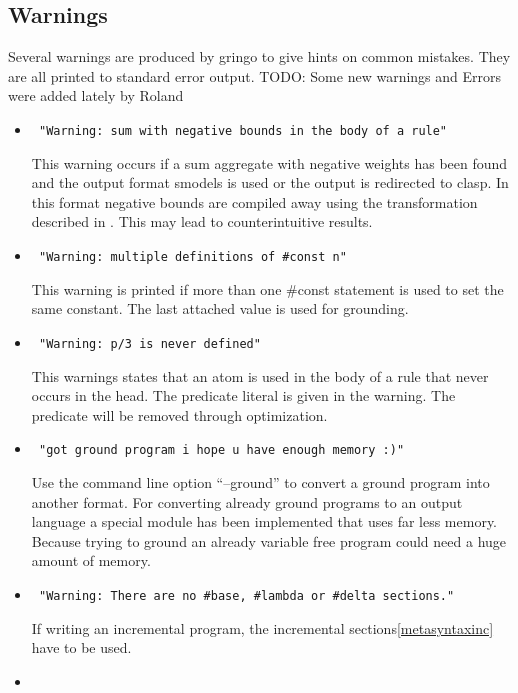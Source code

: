 \documentclass[a4paper,10pt]{article}
\begin{document}
\subsection{Warnings}
Several warnings are produced by gringo to give hints on common mistakes.
They are all printed to standard error output.
TODO: Some new warnings and Errors were added lately by Roland

\begin{itemize}
 \item 
\begin{verbatim}
 "Warning: sum with negative bounds in the body of a rule"
\end{verbatim}
This warning occurs if a sum aggregate with negative weights has been found and the output format smodels is used or the output is redirected to clasp. In this format negative bounds are compiled away using the transformation described in \cite{lparseManual}. This may lead to counterintuitive results.
 \item 
\begin{verbatim}
 "Warning: multiple definitions of #const n"
\end{verbatim}
This warning is printed if more than one \#const statement is used to set the same constant.
The last attached value is used for grounding.
\item
\begin{verbatim}
 "Warning: p/3 is never defined"
\end{verbatim}
This warnings states that an atom is used in the body of a rule that never occurs in the head.
The predicate literal is given in the warning. The predicate will be removed through optimization.
\item
\begin{verbatim}
 "got ground program i hope u have enough memory :)"
\end{verbatim}
Use the command line option ``--ground'' to convert a ground program into another format.
For converting already ground programs to an output language a special module has been implemented that uses far less memory. Because trying to ground an already variable free program could need a huge amount of memory.
\item
\begin{verbatim}
 "Warning: There are no #base, #lambda or #delta sections."
\end{verbatim}
If writing an incremental program, the incremental sections\ref{metasyntaxinc} have to be used.
\item
\begin{verbatim}

\end{verbatim}
\end{itemize}
\end{document}
